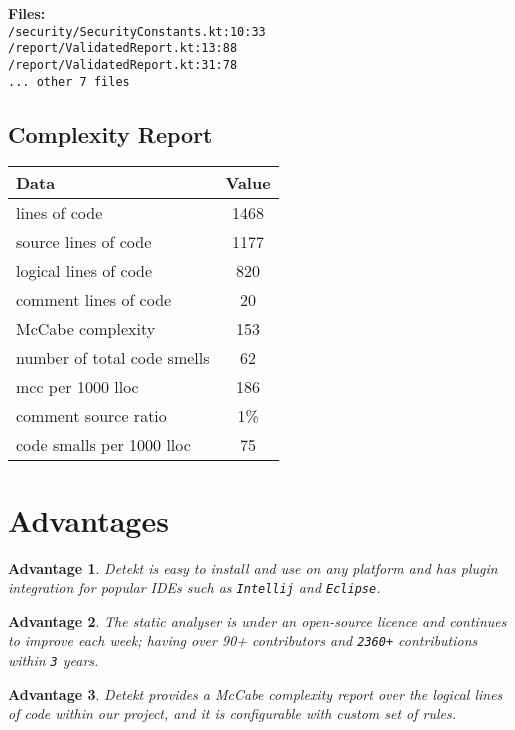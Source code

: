 \documentclass[11pt,twocolumn]{article}
\newtheorem{prof}{Advantage}
\begin{document}
\textbf{Files:} \\
\texttt{/security/SecurityConstants.kt:10:33} \\
\texttt{/report/ValidatedReport.kt:13:88} \\
\texttt{/report/ValidatedReport.kt:31:78} \\
\texttt{... other 7 files}


\subsection{Complexity Report}

\begin{table}[h!]
\begin{tabular}{|l|c|}
\hline
Data                        & Value \\ \hline
lines of code               & 1468  \\ \hline
source lines of code        & 1177  \\ \hline
logical lines of code       & 820   \\ \hline
comment lines of code       & 20    \\ \hline
McCabe complexity           & 153   \\ \hline
number of total code smells & 62    \\ \hline
mcc per 1000 lloc           & 186   \\ \hline
comment source ratio        & 1\%   \\ \hline
code smalls per 1000 lloc   & 75    \\ \hline
\end{tabular}
\end{table}

\section{Advantages}

\begin{prof}
Detekt is easy to install and use on any platform and has plugin integration for popular IDEs such as \texttt{Intellij} and \texttt{Eclipse}.
\end{prof}

\begin{prof}
The static analyser is under an open-source licence and continues to improve each week; having over \textit{90+} contributors and \texttt{2360+} contributions within \texttt{3} years. 
\end{prof}

\begin{prof}
Detekt provides a McCabe complexity report over the logical lines of code within our project, and it is configurable with custom set of rules. 
\end{prof}
\end{document}
